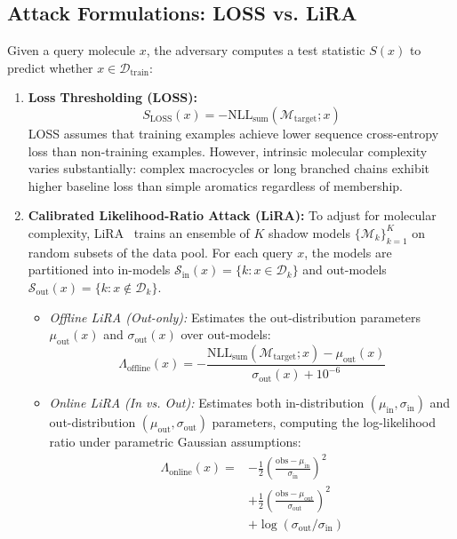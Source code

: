 \documentclass[10pt,journal,compsoc]{IEEEtran}
\begin{document}
\subsection{Attack Formulations: LOSS vs. LiRA}
Given a query molecule $x$, the adversary computes a test statistic $S(x)$ to predict whether $x \in \mathcal{D}_{\text{train}}$:
\begin{enumerate}
    \item \textbf{Loss Thresholding (LOSS):}
    \begin{equation}
    S_{\text{LOSS}}(x) = - \text{NLL}_{\text{sum}}(\mathcal{M}_{\text{target}}; x)
    \end{equation}
    LOSS assumes that training examples achieve lower sequence cross-entropy loss than non-training examples. However, intrinsic molecular complexity varies substantially: complex macrocycles or long branched chains exhibit higher baseline loss than simple aromatics regardless of membership.
    \item \textbf{Calibrated Likelihood-Ratio Attack (LiRA):} To adjust for molecular complexity, LiRA~\cite{carlini2022membership} trains an ensemble of $K$ shadow models $\{\mathcal{M}_k\}_{k=1}^K$ on random subsets of the data pool. For each query $x$, the models are partitioned into in-models $\mathcal{S}_{\text{in}}(x) = \{k : x \in \mathcal{D}_k\}$ and out-models $\mathcal{S}_{\text{out}}(x) = \{k : x \notin \mathcal{D}_k\}$.
    \begin{itemize}
        \item \textit{Offline LiRA (Out-only):} Estimates the out-distribution parameters $\mu_{\text{out}}(x)$ and $\sigma_{\text{out}}(x)$ over out-models:
        \begin{equation}
        \Lambda_{\text{offline}}(x) = - \frac{\text{NLL}_{\text{sum}}(\mathcal{M}_{\text{target}}; x) - \mu_{\text{out}}(x)}{\sigma_{\text{out}}(x) + 10^{-6}}
        \end{equation}
        \item \textit{Online LiRA (In vs. Out):} Estimates both in-distribution $(\mu_{\text{in}}, \sigma_{\text{in}})$ and out-distribution $(\mu_{\text{out}}, \sigma_{\text{out}})$ parameters, computing the log-likelihood ratio under parametric Gaussian assumptions:
        \begin{align}
        \Lambda_{\text{online}}(x) = &-\frac{1}{2}\left(\frac{\text{obs} - \mu_{\text{in}}}{\sigma_{\text{in}}}\right)^2 \nonumber \\
        &+ \frac{1}{2}\left(\frac{\text{obs} - \mu_{\text{out}}}{\sigma_{\text{out}}}\right)^2 \nonumber \\
        &+ \log(\sigma_{\text{out}}/\sigma_{\text{in}})
        \end{align}
    \end{itemize}
\end{enumerate}
\end{document}
